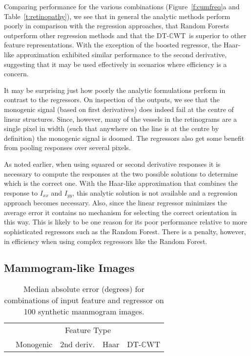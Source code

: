 \documentclass[10pt,twocolumn,letterpaper]{article}
\newcommand{\fref}[1]{Figure~\ref{#1}}
\newcommand{\tref}[1]{Table~\ref{#1}}
\def\Ixx{I_{xx}}
\def\Iyy{I_{yy}}
\def\dtcwt{DT-$\mathbb{C}$WT}
\begin{document}
Comparing performance for the various combinations (\fref{f:cumfreq}a and \tref{t:retinopathy}), we see that in general the analytic methods perform poorly in comparison with the regression approaches, that Random Forests outperform other regression methods and that the \dtcwt~is superior to other feature representations. With the exception of the boosted regressor, the Haar-like approximation exhibited similar performance to the second derivative, suggesting that it may be used effectively in scenarios where efficiency is a concern.

It may be surprising just how poorly the analytic formulations perform in contrast to the regressors. On inspection of the outputs, we see that the monogenic signal (based on first derivatives) does indeed fail at the centre of linear structures. Since, however, many of the vessels in the retinograms are a single pixel in width (such that anywhere on the line is at the centre by definition) the monogenic signal is doomed. The regressors also get some benefit from pooling responses over several pixels.

As noted earlier, when using squared or second derivative responses it is necessary to compute the responses at the two possible solutions to determine which is the correct one. With the Haar-like approximation that combines the response to $\Ixx$ and $\Iyy$, this analytic solution is not available and a regression approach becomes necessary. Also, since the linear regressor minimizes the average error it contains no mechanism for selecting the correct orientation in this way. This is likely to be one reason for its poor performance relative to more sophisticated regressors such as the Random Forest. There is a penalty, however, in efficiency when using complex regressors like the Random Forest.


\subsection{Mammogram-like Images}
\label{s:expts_synth_mammography}
\begin{table}[t]
\centering
\begin{tabular}{l|c c c c}
							& \multicolumn{4}{c}{Feature Type} \\
							& Monogenic		& 2nd deriv.	& Haar				& \dtcwt \\
\hline

\end{tabular}
%
\caption{Median absolute error (degrees) for combinations of input feature and regressor on 100 synthetic mammogram images.}
\label{t:synth_mammography}
\end{table}
\end{document}
